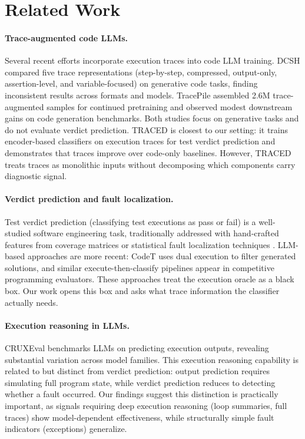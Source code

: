 \documentclass[11pt,a4paper]{article}
\begin{document}
\section{Related Work}

\paragraph{Trace-augmented code LLMs.}
Several recent efforts incorporate execution traces into code LLM training. DCSH \cite{ni2024dcsh} compared five trace representations (step-by-step, compressed, output-only, assertion-level, and variable-focused) on generative code tasks, finding inconsistent results across formats and models. TracePile \cite{tracepile2025} assembled 2.6M trace-augmented samples for continued pretraining and observed modest downstream gains on code generation benchmarks. Both studies focus on generative tasks and do not evaluate verdict prediction. TRACED \cite{traced2024} is closest to our setting: it trains encoder-based classifiers on execution traces for test verdict prediction and demonstrates that traces improve over code-only baselines. However, TRACED treats traces as monolithic inputs without decomposing which components carry diagnostic signal.

\paragraph{Verdict prediction and fault localization.}
Test verdict prediction (classifying test executions as pass or fail) is a well-studied software engineering task, traditionally addressed with hand-crafted features from coverage matrices or statistical fault localization techniques \cite{wong2016survey}. LLM-based approaches are more recent: CodeT \cite{chen2023codet} uses dual execution to filter generated solutions, and similar execute-then-classify pipelines appear in competitive programming evaluators. These approaches treat the execution oracle as a black box. Our work opens this box and asks what trace information the classifier actually needs.

\paragraph{Execution reasoning in LLMs.}
CRUXEval \cite{gu2024cruxeval} benchmarks LLMs on predicting execution outputs, revealing substantial variation across model families. This execution reasoning capability is related to but distinct from verdict prediction: output prediction requires simulating full program state, while verdict prediction reduces to detecting whether a fault occurred. Our findings suggest this distinction is practically important, as signals requiring deep execution reasoning (loop summaries, full traces) show model-dependent effectiveness, while structurally simple fault indicators (exceptions) generalize.
\end{document}
